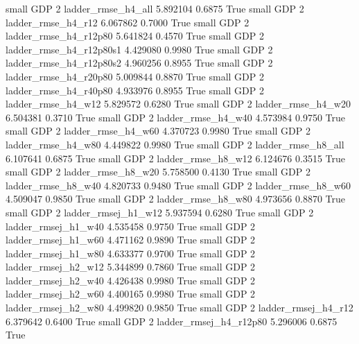      small      GDP                 2       ladder_rmse_h4_all   5.892104      0.6875    True
     small      GDP                 2       ladder_rmse_h4_r12   6.067862      0.7000    True
     small      GDP                 2    ladder_rmse_h4_r12p80   5.641824      0.4570    True
     small      GDP                 2  ladder_rmse_h4_r12p80s1   4.429080      0.9980    True
     small      GDP                 2  ladder_rmse_h4_r12p80s2   4.960256      0.8955    True
     small      GDP                 2    ladder_rmse_h4_r20p80   5.009844      0.8870    True
     small      GDP                 2    ladder_rmse_h4_r40p80   4.933976      0.8955    True
     small      GDP                 2       ladder_rmse_h4_w12   5.829572      0.6280    True
     small      GDP                 2       ladder_rmse_h4_w20   6.504381      0.3710    True
     small      GDP                 2       ladder_rmse_h4_w40   4.573984      0.9750    True
     small      GDP                 2       ladder_rmse_h4_w60   4.370723      0.9980    True
     small      GDP                 2       ladder_rmse_h4_w80   4.449822      0.9980    True
     small      GDP                 2       ladder_rmse_h8_all   6.107641      0.6875    True
     small      GDP                 2       ladder_rmse_h8_w12   6.124676      0.3515    True
     small      GDP                 2       ladder_rmse_h8_w20   5.758500      0.4130    True
     small      GDP                 2       ladder_rmse_h8_w40   4.820733      0.9480    True
     small      GDP                 2       ladder_rmse_h8_w60   4.509047      0.9850    True
     small      GDP                 2       ladder_rmse_h8_w80   4.973656      0.8870    True
     small      GDP                 2      ladder_rmsej_h1_w12   5.937594      0.6280    True
     small      GDP                 2      ladder_rmsej_h1_w40   4.535458      0.9750    True
     small      GDP                 2      ladder_rmsej_h1_w60   4.471162      0.9890    True
     small      GDP                 2      ladder_rmsej_h1_w80   4.633377      0.9700    True
     small      GDP                 2      ladder_rmsej_h2_w12   5.344899      0.7860    True
     small      GDP                 2      ladder_rmsej_h2_w40   4.426438      0.9980    True
     small      GDP                 2      ladder_rmsej_h2_w60   4.400165      0.9980    True
     small      GDP                 2      ladder_rmsej_h2_w80   4.499820      0.9850    True
     small      GDP                 2      ladder_rmsej_h4_r12   6.379642      0.6400    True
     small      GDP                 2   ladder_rmsej_h4_r12p80   5.296006      0.6875    True
